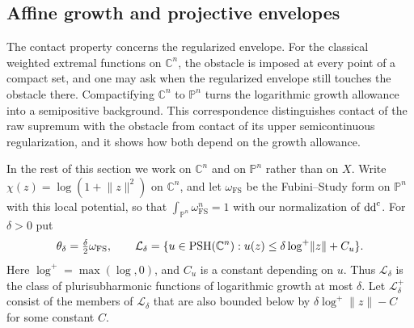 \subsection{Affine growth and projective envelopes}
\label{sec:affine-projective-envelopes}

The contact property concerns the regularized envelope. For the classical weighted extremal functions on $\mathbb C^n$, the obstacle is imposed at every point of a compact set, and one may ask when the regularized envelope still touches the obstacle there. Compactifying $\mathbb C^n$ to $\mathbb P^n$ turns the logarithmic growth allowance into a semipositive background. This correspondence distinguishes contact of the raw supremum with the obstacle from contact of its upper semicontinuous regularization, and it shows how both depend on the growth allowance.

In the rest of this section we work on $\mathbb C^n$ and on $\mathbb P^n$ rather than on $X$. Write $\chi(z)=\log(1+\lVert z\rVert^2)$ on $\mathbb C^n$, and let $\omega_{\mathrm{FS}}$ be the Fubini--Study form on $\mathbb P^n$ with this local potential, so that $\int_{\mathbb P^n}\omega_{\mathrm{FS}}^n=1$ with our normalization of $\mathrm{dd}^{\mathrm{c}}$. For $\delta>0$ put
\[
 \theta_\delta=\tfrac\delta2\omega_{\mathrm{FS}},\qquad
 \mathcal L_\delta=
 \{u\in\mathrm{PSH}(\mathbb C^n):
    u(z)\leq\delta\log^+\lVert z\rVert+C_u\}.
\]
Here $\log^+=\max(\log,0)$, and $C_u$ is a constant depending on $u$. Thus $\mathcal L_\delta$ is the class of plurisubharmonic functions of logarithmic growth at most $\delta$. Let $\mathcal L_\delta^+$ consist of the members of $\mathcal L_\delta$ that are also bounded below by $\delta\log^+\lVert z\rVert-C$ for some constant $C$.

